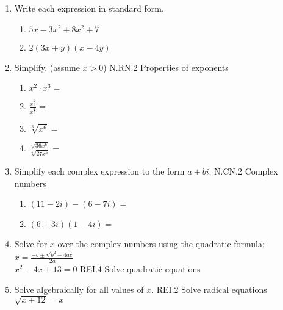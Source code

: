 \documentclass[12pt, twoside]{article}
\begin{document}
\begin{enumerate}[itemsep=0.5cm]
\item Write each expression in standard form.
    \begin{multicols}{2}
    \begin{enumerate}[itemsep=0.5cm]
        \item $5x-3x^2+8x^2+7$
        \item $2(3x+y)(x-4y)$
    \end{enumerate}
    \end{multicols} \vspace{4cm}

\newpage
\item Simplify. (assume $x > 0$) \hfill N.RN.2 Properties of exponents
    \begin{multicols}{2}
    \begin{enumerate}[itemsep=1cm]
        \item $x^2 \cdot x^3 =$
        \item $\displaystyle \frac{x^{\frac{2}{3}}}{x^{\frac{1}{6}}} =$
        \item $\sqrt[3]{x^6} =$
        \item $\displaystyle \frac{\sqrt{36x^6}}{\sqrt[3]{27x^6}} = $
    \end{enumerate}
    \end{multicols} \vspace{1cm}


\item Simplify each complex expression to the form $a+bi$. \hfill N.CN.2 Complex numbers
    \begin{multicols}{2}
    \begin{enumerate}
        \item $(11-2i) - (6-7i)=$
        \item $(6+3i)(1-4i)=$
    \end{enumerate}
    \end{multicols} \vspace{3cm}

\item Solve for $x$ over the complex numbers using the quadratic formula:
$\displaystyle x = \frac{-b \pm \sqrt{b^2-4ac}}{2a}$ \\[0.25cm]
$x^2-4x+13=0$ \hfill REI.4 Solve quadratic equations
\vspace{3cm}


\item Solve algebraically for all values of $x$. \hfill REI.2 Solve radical equations \\[0.25cm]
$\sqrt{x+12}=x$



\end{enumerate}
\end{document}
